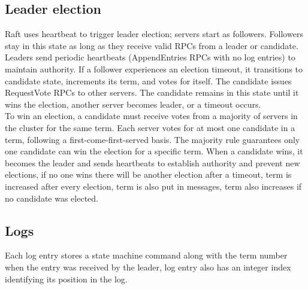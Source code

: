 \documentclass{article}
\begin{document}
\subsection{Leader election}
Raft uses heartbeat to trigger leader election; servers start as followers. Followers stay in this state as long as they receive valid RPCs from a leader or candidate. Leaders send periodic heartbeats (AppendEntries RPCs with no log entries) to maintain authority. If a follower experiences an election timeout, it transitions to candidate state, increments its term, and votes for itself. The candidate issues RequestVote RPCs to other servers. The candidate remains in this state until it wins the election, another server becomes leader, or a timeout occurs.\\
To win an election, a candidate must receive votes from a majority of servers in the cluster for the same term. Each server votes for at most one candidate in a term, following a first-come-first-served basis. The majority rule guarantees only one candidate can win the election for a specific term. When a candidate wins, it becomes the leader and sends heartbeats to establish authority and prevent new elections, if no one wins there will be another election after a timeout, term is increased after every election, term is also put in messages, term also increases if no candidate was elected.
\subsection{Logs}
Each log entry stores a state machine command along with the term
number when the entry was received by the leader, log entry also has an integer index identifying its position in the log.
\end{document}
